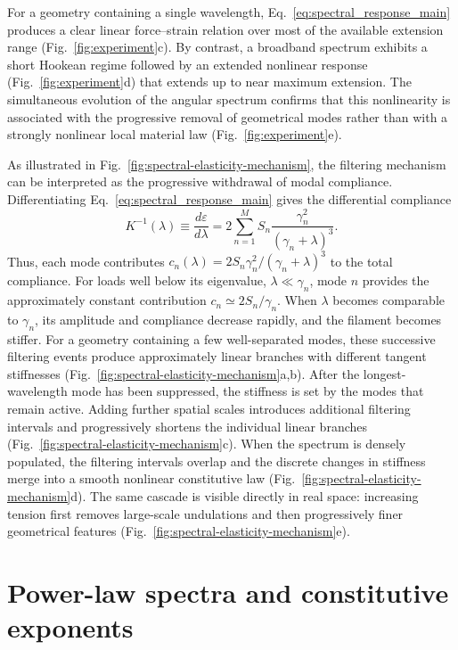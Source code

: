 \documentclass[pdflatex, twocolumn, sn-nature]{sn-jnl}
\begin{document}
For a geometry containing a single wavelength, Eq.~\eqref{eq:spectral_response_main} produces a clear linear force--strain relation over most of the available extension range (Fig.~\ref{fig:experiment}c). By contrast, a broadband spectrum exhibits a short Hookean regime followed by an extended nonlinear response (Fig.~\ref{fig:experiment}d) that extends up to near maximum extension. The simultaneous evolution of the angular spectrum confirms that this nonlinearity is associated with the progressive removal of geometrical modes rather than with a strongly nonlinear local material law (Fig.~\ref{fig:experiment}e).

As illustrated in Fig.~\ref{fig:spectral-elasticity-mechanism}, the filtering mechanism can be interpreted as the progressive withdrawal of modal compliance. Differentiating Eq.~\eqref{eq:spectral_response_main} gives the differential compliance
\begin{equation*}
K^{-1}(\lambda)
\equiv
\frac{d\varepsilon}{d\lambda}
=
2\sum_{n=1}^{M}
S_n
\frac{\gamma_n^2}{(\gamma_n+\lambda)^3}.
\label{eq:compliance_main}
\end{equation*}
Thus, each mode contributes $c_n(\lambda)=2S_n \gamma_n^2/(\gamma_n+\lambda)^3$ to the total compliance. For loads well below its eigenvalue,
\(\lambda\ll\gamma_n\), mode \(n\) provides the approximately
constant contribution \(c_n\simeq 2S_n/\gamma_n\). When
\(\lambda\) becomes comparable to \(\gamma_n\), its amplitude and
compliance decrease rapidly, and the filament becomes stiffer. For a geometry containing a few well-separated modes, these
successive filtering events produce approximately linear branches
with different tangent stiffnesses (Fig.~\ref{fig:spectral-elasticity-mechanism}a,b). After the
longest-wavelength mode has been suppressed, the stiffness is set
by the modes that remain active. Adding further spatial scales
introduces additional filtering intervals and progressively shortens
the individual linear branches (Fig.~\ref{fig:spectral-elasticity-mechanism}c). When the spectrum is
densely populated, the filtering intervals overlap and the discrete
changes in stiffness merge into a smooth nonlinear constitutive law
(Fig.~\ref{fig:spectral-elasticity-mechanism}d). The same cascade is visible directly in real space:
increasing tension first removes large-scale undulations and then
progressively finer geometrical features (Fig.~\ref{fig:spectral-elasticity-mechanism}e).

\section*{Power-law spectra and constitutive exponents}
\label{sec:power_law}
\end{document}
